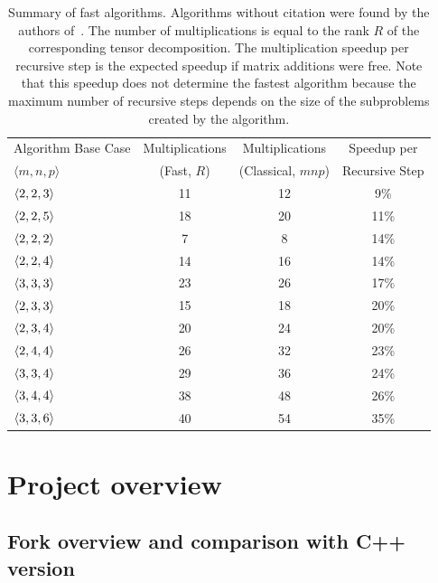 \documentclass[a4paper, leqno, 11pt]{article}
\theoremstyle{definition}
\theoremstyle{remark}
\theoremstyle{experimental}
\begin{document}
\begin{table}[tb]
\centering
\caption{
Summary of fast algorithms.
Algorithms without citation were found by the authors of~\cite{bensonballard2015}.
The number of multiplications  is equal to the rank $R$ of the corresponding tensor decomposition.
The multiplication speedup per recursive step is the expected speedup if
matrix additions were free.
Note that this speedup does not determine the fastest algorithm because the maximum number
of recursive steps depends on the size of the subproblems created by the algorithm.
}
\begin{tabular}{l c c c}
\toprule
Algorithm Base Case & Multiplications & Multiplications & Speedup per \\
$\langle m, n, p \rangle$ & (Fast, $R$) & (Classical, $mnp$) & Recursive Step \\
\midrule
$\angb{2,2,3}$ & 11 & 12 & 9\% \\
$\angb{2,2,5}$ & 18 & 20 & 11\% \\
$\angb{2,2,2}$ \cite{strassen1969} & 7 & 8 & 14\% \\
$\angb{2,2,4}$ & 14 & 16 & 14\% \\
$\angb{3,3,3}$ & 23 & 26 & 17\% \\
$\angb{2,3,3}$ & 15 & 18 & 20\% \\
$\angb{2,3,4}$ & 20 & 24 & 20\% \\
$\angb{2,4,4}$ & 26 & 32 & 23\% \\
$\angb{3,3,4}$ & 29 & 36 & 24\% \\
$\angb{3,4,4}$ & 38 & 48 & 26\% \\
$\angb{3,3,6}$ \cite{smirnov2013bilinear} & 40 & 54 & 35\% \\
\bottomrule
\end{tabular}
\label{tab:algorithms}
\end{table}


\section{Project overview}
\label{sec:overview}

\subsection{Fork overview and comparison with C++ version}
\end{document}
